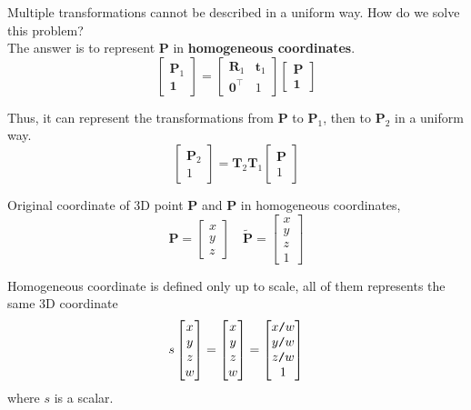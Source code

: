 \documentclass{article}
\begin{document}
Multiple transformations cannot be described in a uniform way. How do we solve this problem? \\ 
The answer is to represent $\mathbf{P}$ in \textbf{homogeneous coordinates}.
\begin{equation}
\begin{bmatrix}
\mathbf{P}_1 \\
\mathbf{1}
\end{bmatrix}
=
\begin{bmatrix}
\mathbf{R}_1 & \mathbf{t}_1 \\
\mathbf{0}^{\top} & 1
\end{bmatrix}
\begin{bmatrix}
\mathbf{P} \\
\mathbf{1}
\end{bmatrix}
\end{equation}

Thus, it can represent the transformations from $\mathbf{P}$ to $\mathbf{P}_1$, then to $\mathbf{P}_2$ in a uniform way.
\begin{equation}
\begin{bmatrix}
\mathbf{P}_2 \\
1
\end{bmatrix}
=
\mathbf{T}_2 \mathbf{T}_1
\begin{bmatrix}
\mathbf{P} \\
1
\end{bmatrix}
\end{equation}

Original coordinate of 3D point $\mathbf{P}$ and $\mathbf{P}$ in homogeneous coordinates,
\begin{equation}
\mathbf{P} =
\begin{bmatrix}
x \\
y \\
z
\end{bmatrix}
\quad
\mathbf{\tilde P} =
\begin{bmatrix}
x \\
y \\
z \\
1
\end{bmatrix}
\end{equation}

Homogeneous coordinate is defined only up to scale, all of them represents the same 3D coordinate
\begin{equation}
s
\begin{bmatrix}
x \\
y \\
z \\
w
\end{bmatrix}
=
\begin{bmatrix}
x \\
y \\
z \\
w
\end{bmatrix}
=
\begin{bmatrix}
x \verb|/| w \\
y \verb|/| w \\
z \verb|/| w   \\
1 
\end{bmatrix}
\end{equation}
where $s$ is a scalar.
\end{document}
